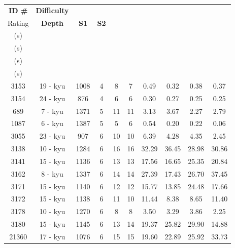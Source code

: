 \documentclass{l4proj}
\begin{document}
\begin{appendices}
\begin{longtable}{|c|c|c|c|c|c|c|c|c|c|}
\hline
\textbf{ID \#} & \textbf{Difficulty} & \textbf{\begin{tabular}[c]{@{}c@{}}Difficulty \\ Rating\end{tabular}} & \textbf{Depth} & \textbf{S1} & \textbf{S2} & \textbf{\begin{tabular}[c]{@{}c@{}}T1 \\ (s)\end{tabular}} & \textbf{\begin{tabular}[c]{@{}c@{}}T2 \\ (s)\end{tabular}} & \textbf{\begin{tabular}[c]{@{}c@{}}T3 \\ (s)\end{tabular}} & \textbf{\begin{tabular}[c]{@{}c@{}}T4 \\ (s)\end{tabular}} \\ \hline
\endfirsthead
%
\endhead
%
3153 & 19 - kyu & 1008 & 4 & 8 & 7 & 0.49 & 0.32 & 0.38 & 0.37 \\ \hline
3154 & 24 - kyu & 876 & 4 & 6 & 6 & 0.30 & 0.27 & 0.25 & 0.25 \\ \hline
689 & 7 - kyu & 1371 & 5 & 11 & 11 & 3.13 & 3.67 & 2.27 & 2.79 \\ \hline
1087 & 6 - kyu & 1387 & 5 & 5 & 6 & 0.54 & 0.20 & 0.22 & 0.06 \\ \hline
3055 & 23 - kyu & 907 & 6 & 10 & 10 & 6.39 & 4.28 & 4.35 & 2.45 \\ \hline
3138 & 10 - kyu & 1284 & 6 & 16 & 16 & 32.29 & 36.45 & 28.98 & 30.86 \\ \hline
3141 & 15 - kyu & 1136 & 6 & 13 & 13 & 17.56 & 16.65 & 25.35 & 20.84 \\ \hline
3162 & 8 - kyu & 1337 & 6 & 14 & 14 & 27.39 & 17.43 & 26.70 & 37.45 \\ \hline
3171 & 15 - kyu & 1140 & 6 & 12 & 12 & 15.77 & 13.85 & 24.48 & 17.66 \\ \hline
3172 & 15 - kyu & 1138 & 6 & 11 & 10 & 11.44 & 8.38 & 8.65 & 11.40 \\ \hline
3178 & 10 - kyu & 1270 & 6 & 8 & 8 & 3.50 & 3.29 & 3.86 & 2.25 \\ \hline
3180 & 15 - kyu & 1145 & 6 & 13 & 14 & 19.37 & 25.82 & 29.90 & 14.88 \\ \hline
21360 & 17 - kyu & 1076 & 6 & 15 & 15 & 19.60 & 22.89 & 25.92 & 33.73 \\ \hline

\end{longtable}
\end{appendices}
\end{document}
